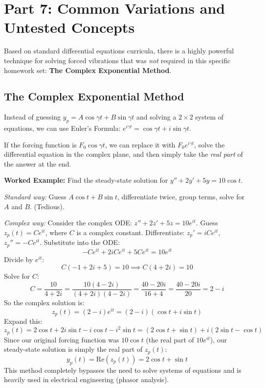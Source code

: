 \documentclass[11pt]{article}
\begin{document}
\newpage
\section{Part 7: Common Variations and Untested Concepts}

Based on standard differential equations curricula, there is a highly powerful technique for solving forced vibrations that was \textit{not} required in this specific homework set: \textbf{The Complex Exponential Method}.

\subsection{The Complex Exponential Method}
Instead of guessing $y_p = A \cos \gamma t + B \sin \gamma t$ and solving a $2 \times 2$ system of equations, we can use Euler's Formula: $e^{i\gamma t} = \cos \gamma t + i \sin \gamma t$. 

If the forcing function is $F_0 \cos \gamma t$, we can replace it with $F_0 e^{i\gamma t}$, solve the differential equation in the complex plane, and then simply take the \textit{real part} of the answer at the end.

\textbf{Worked Example:}
Find the steady-state solution for $y'' + 2y' + 5y = 10 \cos t$.

\textit{Standard way:} Guess $A \cos t + B \sin t$, differentiate twice, group terms, solve for $A$ and $B$. (Tedious).

\textit{Complex way:}
Consider the complex ODE: $z'' + 2z' + 5z = 10 e^{it}$.
Guess $z_p(t) = C e^{it}$, where $C$ is a complex constant.
Differentiate: $z_p' = iC e^{it}$, $z_p'' = -C e^{it}$.
Substitute into the ODE:
\[ -C e^{it} + 2iC e^{it} + 5C e^{it} = 10 e^{it} \]
Divide by $e^{it}$:
\[ C(-1 + 2i + 5) = 10 \implies C(4 + 2i) = 10 \]
Solve for $C$:
\[ C = \frac{10}{4 + 2i} = \frac{10(4 - 2i)}{(4 + 2i)(4 - 2i)} = \frac{40 - 20i}{16 + 4} = \frac{40 - 20i}{20} = 2 - i \]
So the complex solution is:
\[ z_p(t) = (2 - i) e^{it} = (2 - i)(\cos t + i \sin t) \]
Expand this:
\[ z_p(t) = 2 \cos t + 2i \sin t - i \cos t - i^2 \sin t = (2 \cos t + \sin t) + i(2 \sin t - \cos t) \]
Since our original forcing function was $10 \cos t$ (the real part of $10 e^{it}$), our steady-state solution is simply the real part of $z_p(t)$:
\[ y_p(t) = \text{Re}(z_p(t)) = 2 \cos t + \sin t \]
This method completely bypasses the need to solve systems of equations and is heavily used in electrical engineering (phasor analysis).
\end{document}
